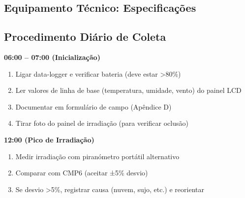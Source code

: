 \documentclass[12pt, a4paper]{article}
\begin{document}
\subsection{Equipamento Técnico: Especificações}

\begin{table}[H]
\centering
\caption{Equipamento Requerido para Validação (Fase 1-3)}
\label{tab:equipment_specs}
\small
{}
\end{table}

\subsection{Procedimento Diário de Coleta}

\textbf{06:00 – 07:00 (Inicialização)}
\begin{enumerate}
\item Ligar data-logger e verificar bateria (deve estar >80\%)
\item Ler valores de linha de base (temperatura, umidade, vento) do painel LCD
\item Documentar em formulário de campo (Apêndice D)
\item Tirar foto do painel de irradiação (para verificar oclusão)
\end{enumerate}

\textbf{12:00 (Pico de Irradiação)}
\begin{enumerate}
\item Medir irradiação com piranómetro portátil alternativo
\item Comparar com CMP6 (aceitar ±5\% desvio)
\item Se desvio >5\%, registrar causa (nuvem, sujo, etc.) e reorientar
\end{enumerate}
\end{document}
